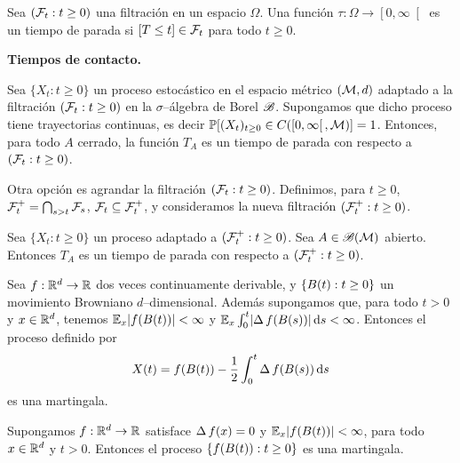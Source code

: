 \begin{definition}
Sea \((\mathcal{F}_t : t \geq 0)\) una filtración en un espacio \(\Omega\).
Una función \(\tau : \Omega \rightarrow \left[ 0, \infty \right[\) es un tiempo de parada si \([T \leq t] \in \mathcal{F}_t\) para todo \(t \geq 0\).
\end{definition}

\textbf{Tiempos de contacto.}

\begin{proposition}
  Sea \(\{X_t : t \geq 0\}\) un proceso estocástico en el espacio métrico \((\mathcal{M}{}, d)\) adaptado a la filtración \((\mathcal{F}_t : t \geq 0)\) en la \(\sigma\)--álgebra de Borel \(\mathscr{B}\).
  Supongamos que dicho proceso tiene trayectorias continuas, es decir \(\mathbb{P}[ (X_t)_{t \geq 0} \in C(\left[0, \infty \right[, \mathcal{M}{})] = 1\).
  Entonces, para todo \(A\) cerrado, la función \(T_A\) es un tiempo de parada con respecto a \((\mathcal{F}_t : t \geq 0)\).
\end{proposition}

Otra opción es agrandar la filtración \((\mathcal{F}_t : t \geq 0)\).
Definimos, para \(t \geq 0\), \(\mathcal{F}^+_t = \bigcap_{s > t} \mathcal{F}_s\), \(\mathcal{F}_t \subseteq \mathcal{F}^+_t\), y consideramos la nueva filtración \((\mathcal{F}^+_t : t \geq 0)\).
\begin{proposition}
  Sea \(\{X_t : t \geq 0\}\) un proceso \cadlag{} adaptado a \((\mathcal{F}^+_t : t \geq 0)\).
  Sea \(A \in \mathscr{B}(\mathcal{M}{})\) abierto.
  Entonces \(T_A\) es un tiempo de parada con respecto a \((\mathcal{F}^+_t : t \geq 0)\).
\end{proposition}


\begin{theorem}
  Sea \(f : \mathbb{R}^d \rightarrow \mathbb{R}\) dos veces continuamente derivable, y \(\{B(t) : t \geq 0\}\) un movimiento Browniano \(d\)--dimensional.
  Además supongamos que, para todo \(t > 0\) y \(x \in \mathbb{R}^d\), tenemos \(\operatorname{\mathbb{E}}_x \lvert f(B(t))\rvert < \infty\) y \(\operatorname{\mathbb{E}}_x \int_0^t \lvert\operatorname{\Delta} f(B(s))\rvert \mathop{}\!\mathrm{d} s < \infty\).
  Entonces el proceso definido por
  \begin{align}
    X(t)
    =
    f(B(t)) - \frac{1}{2} \int_0^t \operatorname{\Delta} f(B(s)) \mathop{}\!\mathrm{d} s
  \end{align}
  es una martingala.
\end{theorem}
\begin{corollary}
  Supongamos \(f : \mathbb{R}^d \rightarrow \mathbb{R}\) satisface \(\operatorname{\Delta} f(x) = 0\) y \(\operatorname{\mathbb{E}}_x \lvert f(B(t))\rvert < \infty\), para todo \(x \in \mathbb{R}^d\) y \(t > 0\).
  Entonces el proceso \(\{f(B(t)) : t \geq 0\}\) es una martingala.
\end{corollary}


